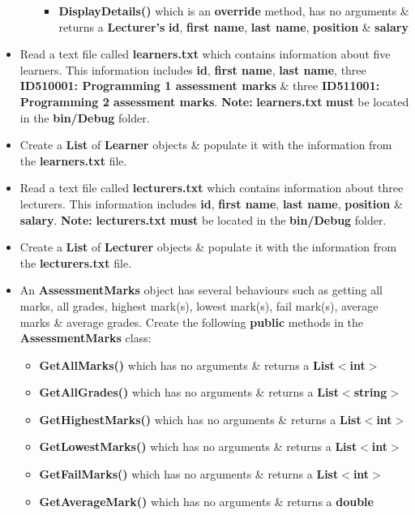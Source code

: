 \documentclass{article}
\begin{document}
\begin{itemize}
\begin{itemize}
\begin{itemize}
            \item \textbf{DisplayDetails()} which is an \textbf{override} method, has no arguments \& returns a \textbf{Lecturer's} \textbf{id}, \textbf{first name}, \textbf{last name}, \textbf{position} \& \textbf{salary}
        \end{itemize}
    \end{itemize}
    \item Read a text file called \textbf{learners.txt} which contains information about five learners. This information includes \textbf{id}, \textbf{first name}, \textbf{last name}, three \textbf{ID510001: Programming 1 assessment marks} \& three \textbf{ID511001: Programming 2 assessment marks}. \textbf{Note:} \textbf{learners.txt} \textbf{must} be located in the \textbf{bin/Debug} folder.
    \item Create a \textbf{List} of \textbf{Learner} objects \& populate it with the information from the \textbf{learners.txt} file.
    \item Read a text file called \textbf{lecturers.txt} which contains information about three lecturers. This information includes \textbf{id}, \textbf{first name}, \textbf{last name}, \textbf{position} \& \textbf{salary}. \textbf{Note:} \textbf{lecturers.txt} \textbf{must} be located in the \textbf{bin/Debug} folder.
    \item Create a \textbf{List} of \textbf{Lecturer} objects \& populate it with the information from the \textbf{lecturers.txt} file.
    \item An \textbf{AssessmentMarks} object has several behaviours such as getting all marks, all grades, highest mark(s), lowest mark(s), fail mark(s), average marks \& average grades. Create the following \textbf{public} methods in the \textbf{AssessmentMarks} class:
    \begin{itemize}
        \item \textbf{GetAllMarks()} which has no arguments \& returns a \textbf{List$<$int$>$} 
        \item \textbf{GetAllGrades()} which has no arguments \& returns a \textbf{List$<$string$>$}
        \item \textbf{GetHighestMarks()} which has no arguments \& returns a \textbf{List$<$int$>$}
        \item \textbf{GetLowestMarks()} which has no arguments \& returns a \textbf{List$<$int$>$}
        \item \textbf{GetFailMarks()} which has no arguments \& returns a \textbf{List$<$int$>$}
        \item \textbf{GetAverageMark()} which has no arguments \& returns a \textbf{double}

\end{itemize}
\end{itemize}
\end{document}
